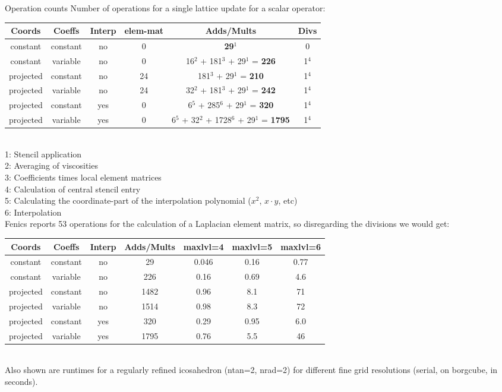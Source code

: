 \documentclass[a4paper,11pt,reqno]{amsart}
\numberwithin{figure}{section}
\numberwithin{table}{section}
\begin{document}
\clearpage

\begin{section}{Operation counts}
\label{sec:operationCounts}
%
Number of operations for a single lattice update for a scalar operator:\\
%
\begin{tabular}{c|c|c|c|c|c}
 \textbf{Coords} & \textbf{Coeffs} & \textbf{Interp} & \textbf{elem-mat} & \textbf{Adds/Mults} & \textbf{Divs} \\
 \hline
 constant  & constant & no  & 0  & \textbf{29}$^1$                                    & 0     \\
 constant  & variable & no  & 0  & 16$^2$ + 181$^3$ + 29$^1$ = \textbf{226}           & 1$^4$ \\
 projected & constant & no  & 24 & 181$^3$ + 29$^1$ = \textbf{210}                    & 1$^4$ \\
 projected & variable & no  & 24 & 32$^2$ + 181$^3$ + 29$^1$ = \textbf{242}           & 1$^4$ \\
 projected & constant & yes & 0  & 6$^5$ + 285$^6$ + 29$^1$ = \textbf{320}            & 1$^4$ \\
 projected & variable & yes & 0  & 6$^5$ + 32$^2$ + 1728$^6$ + 29$^1$ = \textbf{1795} & 1$^4$ \\
\end{tabular}\\
%
1: Stencil application\\
2: Averaging of viscosities\\
3: Coefficients times local element matrices\\
4: Calculation of central stencil entry\\
5: Calculating the coordinate-part of the interpolation polynomial ($x^2$, $x \cdot y$, etc)\\
6: Interpolation\\

Fenics reports 53 operations for the calculation of a Laplacian element matrix, so disregarding the divisions we would get:\\
%
\begin{tabular}{c|c|c|c|c|c|c}
 \textbf{Coords} & \textbf{Coeffs} & \textbf{Interp} & \textbf{Adds/Mults} & \textbf{maxlvl=4} & \textbf{maxlvl=5} & \textbf{maxlvl=6} \\
 \hline
 constant  & constant & no  & 29   & 0.046 & 0.16 & 0.77 \\
 constant  & variable & no  & 226  & 0.16  & 0.69 & 4.6  \\
 projected & constant & no  & 1482 & 0.96  & 8.1  & 71   \\
 projected & variable & no  & 1514 & 0.98  & 8.3  & 72   \\
 projected & constant & yes & 320  & 0.29  & 0.95 & 6.0  \\
 projected & variable & yes & 1795 & 0.76  & 5.5  & 46   \\
\end{tabular}\\
Also shown are runtimes for a regularly refined icosahedron (ntan=2, nrad=2) for different fine grid resolutions (serial, on borgcube, in seconds).


\end{section}
\end{document}
